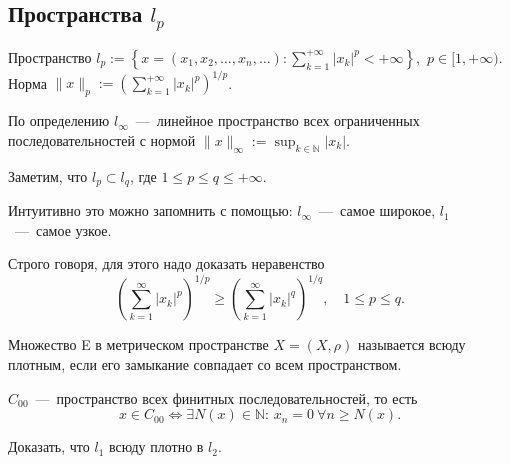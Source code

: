 \subsection{Пространства $l_p$}

\begin{definition}
    Пространство $\displaystyle l_p := \left\{ x = (x_1, x_2, \ldots, x_n, \ldots) : \sum_{k = 1}^{+\infty} |x_k|^p < +\infty \right\},$ $p \in [1, +\infty)$.\\
    Норма $\displaystyle \| x\|_p := \left( \sum_{k = 1}^{+\infty} |x_k|^p \right)^{1 / p}$.

    По определению $l_{\infty}$~---~линейное пространство всех ограниченных последовательностей с нормой $\displaystyle \| x\|_{\infty} := \sup_{k \in \mathbb{N}} |x_k|$.
\end{definition}

\begin{note}
    Заметим, что $l_p \subset l_q$, где $1 \leq p \leq q \leq +\infty$.

    Интуитивно это можно запомнить с помощью: $l_{\infty}$~---~самое широкое, $l_1$~---~самое узкое.
\end{note}

\begin{remark}
    Строго говоря, для этого надо доказать неравенство
    $$\left( \sum_{k = 1}^{\infty} |x_k|^p\right)^{1/p} \geq \left( \sum_{k = 1}^{\infty} |x_k|^q\right)^{1/q}, \quad 1 \leq p \leq q.$$
\end{remark}

\begin{definition}
    Множество E в метрическом пространстве $X = (X, \rho)$ называется всюду плотным, если его замыкание совпадает со всем пространством.
\end{definition}

\begin{definition}
    $C_{00}$~---~пространство всех финитных последовательностей, то есть
    $$x \in C_{00} \Longleftrightarrow \exists N(x) \in \mathbb{N}\text{: } x_n = 0 \ \forall n \geq N(x).$$
\end{definition}

\begin{problem}
    Доказать, что $l_1$ всюду плотно в $l_2$.
\end{problem}

